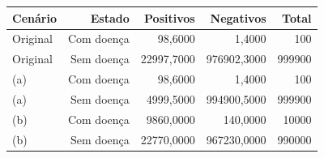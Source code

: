 \begin{tabular}{lrrrr}
\toprule
Cenário & Estado & Positivos & Negativos & Total \\
\midrule
Original & Com doença & 98,6000 & 1,4000 & 100 \\
Original & Sem doença & 22997,7000 & 976902,3000 & 999900 \\
(a) & Com doença & 98,6000 & 1,4000 & 100 \\
(a) & Sem doença & 4999,5000 & 994900,5000 & 999900 \\
(b) & Com doença & 9860,0000 & 140,0000 & 10000 \\
(b) & Sem doença & 22770,0000 & 967230,0000 & 990000 \\
\bottomrule
\end{tabular}
